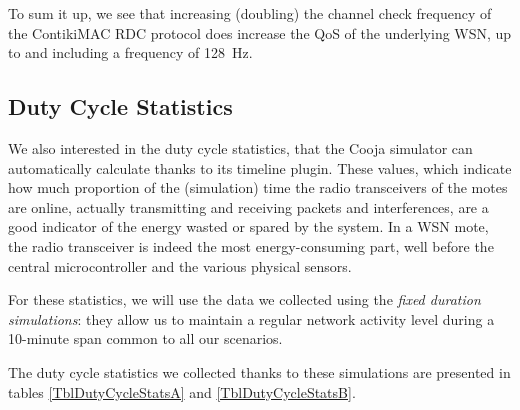 \documentclass[a4paper,twoside]{article}
\begin{document}
To sum it up, we see that increasing (doubling) the channel check frequency
of the ContikiMAC RDC protocol does increase the QoS of the underlying WSN,
up to and including a frequency of 128~Hz.


\subsection{Duty Cycle Statistics}

We also interested in the duty cycle statistics, that the Cooja simulator
can automatically calculate thanks to its timeline plugin. These values,
which indicate how much proportion of the (simulation) time the radio
transceivers of the motes are online, actually transmitting and receiving
packets and interferences, are a good indicator of the energy wasted or
spared by the system. In a WSN mote, the radio transceiver is indeed the
most energy-consuming part, well before the central microcontroller and
the various physical sensors.

For these statistics, we will use the data we collected using the
\emph{fixed duration simulations}: they allow us to maintain a regular
network activity level during a 10-minute span common to all our scenarios.

The duty cycle statistics we collected thanks to these simulations are
presented in tables \ref{TblDutyCycleStatsA} and \ref{TblDutyCycleStatsB}.
\end{document}
